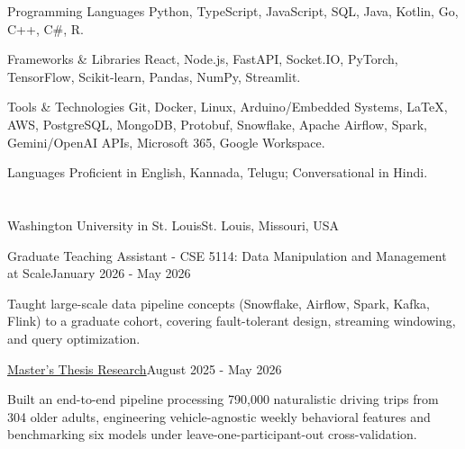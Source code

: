 \documentclass[10pt, letterpaper]{article}
\begin{document}
\vspace{\entrySpacing}
\begin{skillcategory}{Programming Languages}
	Python, TypeScript, JavaScript, SQL, Java, Kotlin, Go, C++, C\#, R.
\end{skillcategory}

\vspace{\entrySpacing}
\begin{skillcategory}{Frameworks \& Libraries}
	React, Node.js, FastAPI, Socket.IO, PyTorch, TensorFlow, Scikit-learn, Pandas, NumPy, Streamlit.
\end{skillcategory}

\vspace{\entrySpacing}
\begin{skillcategory}{Tools \& Technologies}
	Git, Docker, Linux, Arduino/Embedded Systems, \LaTeX, AWS, PostgreSQL, MongoDB, Protobuf, Snowflake, Apache Airflow, Spark, Gemini/OpenAI APIs, Microsoft 365, Google Workspace.
\end{skillcategory}

\vspace{\entrySpacing}
\begin{skillcategory}{Languages}
	Proficient in English, Kannada, Telugu; Conversational in Hindi.
\end{skillcategory}

\vspace{\headerSpacing}


\section{}

\vspace{\entrySpacing}
\begin{leadershipentry}{Washington University in St. Louis}{St. Louis, Missouri, USA}
	\begin{positionentry}{Graduate Teaching Assistant - CSE 5114: Data Manipulation and Management at Scale}{January 2026 - May 2026}
		\item Taught large-scale data pipeline concepts (Snowflake, Airflow, Spark, Kafka, Flink) to a graduate cohort, covering fault-tolerant design, streaming windowing, and query optimization.
	\end{positionentry}
	\begin{positionentry}{\href{https://agreddy.com/projects/ms-thesis}{Master's Thesis Research}}{August 2025 - May 2026}
		\item Built an end-to-end pipeline processing 790,000 naturalistic driving trips from 304 older adults, engineering vehicle-agnostic weekly behavioral features and benchmarking six models under leave-one-participant-out cross-validation.
	\end{positionentry}
\end{leadershipentry}
\end{document}
